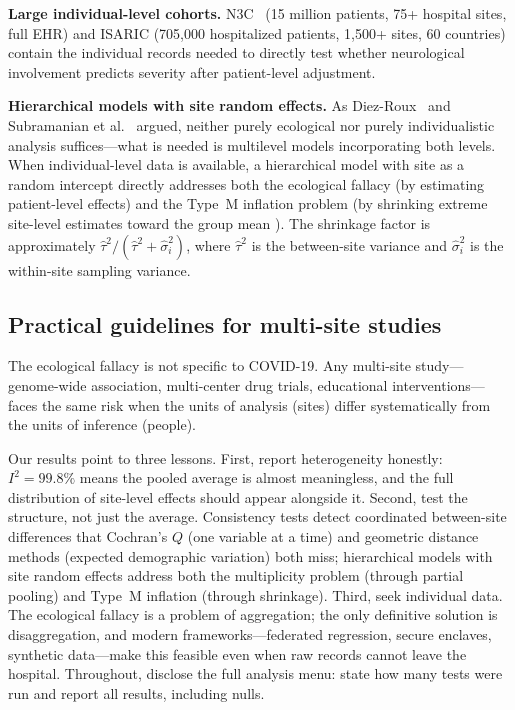 \documentclass{article}
\begin{document}
\textbf{Large individual-level cohorts.}  N3C~\cite{haendel2021n3c}
(15 million patients, 75+ hospital sites, full EHR) and ISARIC (705,000
hospitalized patients, 1,500+ sites, 60 countries) contain the individual
records needed to directly test whether neurological involvement predicts
severity after patient-level adjustment.

\textbf{Hierarchical models with site random effects.}  As
Diez-Roux~\cite{diezroux2000multilevel} and
Subramanian et al.~\cite{subramanian2009revisiting} argued, neither
purely ecological nor purely individualistic analysis suffices---what is
needed is multilevel models incorporating both levels.  When
individual-level data is available, a hierarchical model with site as a
random intercept directly addresses both the ecological fallacy (by
estimating patient-level effects) and the Type~M inflation problem (by
shrinking extreme site-level estimates toward the group mean
\cite{gelman2012multilevel}).  The shrinkage factor is approximately
$\hat\tau^2 / (\hat\tau^2 + \hat\sigma_i^2)$, where $\hat\tau^2$ is
the between-site variance and $\hat\sigma_i^2$ is the within-site
sampling variance.

\subsection{Practical guidelines for multi-site studies}

The ecological fallacy is not specific to COVID-19.  Any multi-site
study---genome-wide association, multi-center drug trials, educational
interventions---faces the same risk when the units of analysis (sites)
differ systematically from the units of inference (people).

Our results point to three lessons.  First, report heterogeneity honestly:
$I^2 = 99.8\%$ means the pooled average is almost meaningless, and the
full distribution of site-level effects should appear alongside it.
Second, test the structure, not just the average.  Consistency tests detect
coordinated between-site differences that Cochran's $Q$ (one variable at a
time) and geometric distance methods (expected demographic variation) both
miss; hierarchical models with site random effects address both the
multiplicity problem (through partial pooling) and Type~M inflation
(through shrinkage).  Third, seek individual data.  The ecological fallacy
is a problem of aggregation; the only definitive solution is
disaggregation, and modern frameworks---federated regression, secure
enclaves, synthetic data---make this feasible even when raw records cannot
leave the hospital.  Throughout, disclose the full analysis menu: state how
many tests were run and report all results, including nulls.
\end{document}
